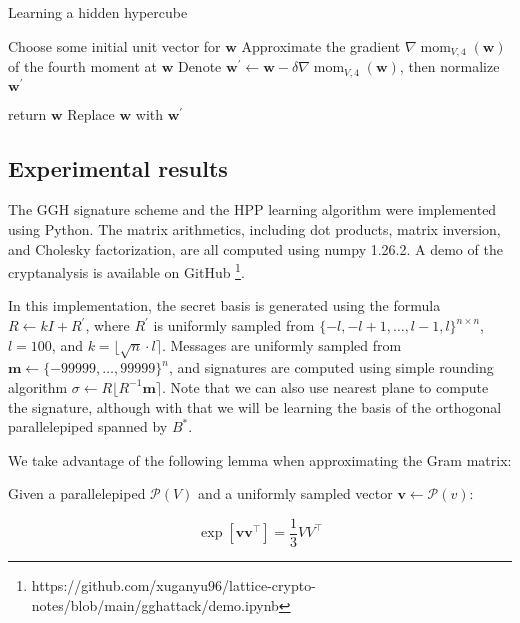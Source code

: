 \begin{algorithm}\label{algo-learning-hypercube}
\caption{Learning a hidden hypercube}
\begin{algorithmic}[1]
    \State Choose some initial unit vector for $\mathbf{w}$
        \State Approximate the gradient $\nabla \operatorname{mom}_{V, 4}(\mathbf{w})$ of the fourth moment at $\mathbf{w}$
        \State Denote $\mathbf{w}^\prime \leftarrow \mathbf{w} - \delta \nabla \operatorname{mom}_{V, 4}(\mathbf{w})$, then normalize $\mathbf{w}^\prime$
        
            \State return $\mathbf{w}$
        \Else
            \State Replace $\mathbf{w}$ with $\mathbf{w}^\prime$
        \EndIf 
    \EndWhile
\end{algorithmic}
\end{algorithm}

\subsection{Experimental results}
The GGH signature scheme and the HPP learning algorithm were implemented using Python. The matrix arithmetics, including dot products, matrix inversion, and Cholesky factorization, are all computed using numpy 1.26.2. A demo of the cryptanalysis is available on GitHub \footnote{https://github.com/xuganyu96/lattice-crypto-notes/blob/main/gghattack/demo.ipynb}.

In this implementation, the secret basis is generated using the formula $R \leftarrow kI + R^\prime$, where $R^\prime$ is uniformly sampled from $\{-l, -l + 1, \ldots, l-1, l\}^{n \times n}$, $l = 100$, and $k = \lfloor \sqrt{n} \cdot l \rceil$. Messages are uniformly sampled from $\mathbf{m} \leftarrow \{-99999, \ldots, 99999\}^n$, and signatures are computed using simple rounding algorithm $\sigma \leftarrow R \lfloor R^{-1}\mathbf{m} \rceil$. Note that we can also use nearest plane to compute the signature, although with that we will be learning the basis of the orthogonal parallelepiped spanned by $B^\ast$.

We take advantage of the following lemma when approximating the Gram matrix:

\begin{lemma}
    Given a parallelepiped $\mathcal{P}(V)$ and a uniformly sampled vector $\mathbf{v} \leftarrow \mathcal{P}(v)$:

    $$
    \exp[\mathbf{v}\mathbf{v}^\intercal] = \frac{1}{3}VV^\intercal
    $$
\end{lemma}

